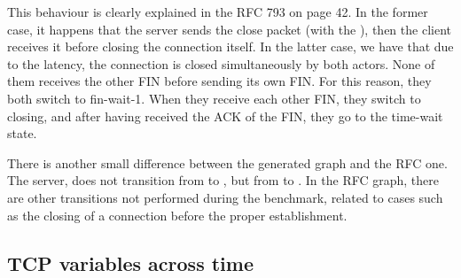 \documentclass[a4paper,10pt]{article}
\begin{document}
This behaviour is clearly explained in the RFC 793\cite{RFC793} on page 42. In the former case, it happens that the server sends the close packet (with the ), then the client receives it before closing the connection itself.
In the latter case, we have that due to the latency, the connection is closed simultaneously by both actors. None of them receives the other FIN before sending its own FIN. For this reason, they both switch to fin-wait-1. When they receive each other FIN, they switch to closing, and after having received the ACK of the FIN, they go to the time-wait state.

There is another small difference between the generated graph and the RFC one. The server, does not transition from  to , but from  to . In the RFC graph, there are other transitions not performed during the benchmark, related to cases such as the closing of a connection before the proper establishment.



\subsection{TCP variables across time}
\label{sec:tcp_variables}
\end{document}
